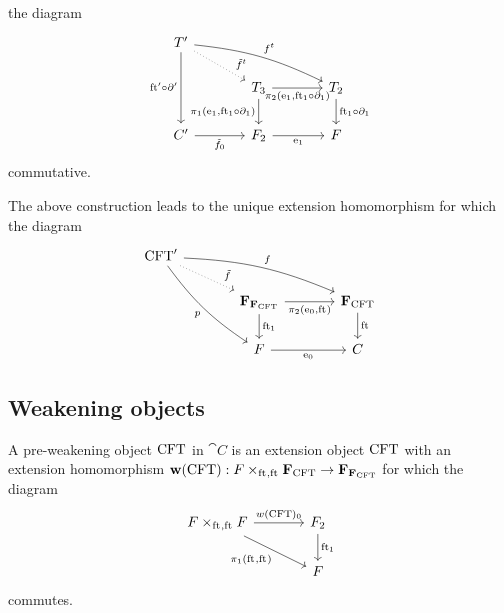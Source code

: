\begin{defn}
\begin{enumerate}
the diagram
\begin{equation*}
\begin{tikzcd}[column sep=large]
\stesyst'
  \ar[bend left=10]{drr}{f^t}
  \ar[swap]{dd}{\eft'\circ\ebd'}
  \ar[dotted]{dr}[near end]{\tilde{f}^t}
  \\
  {}&
\stesyst_3
  \ar{r}[swap]{\pullbackpr{2}{\efamext}{\eft[1]\circ\ebd[1]}}
  \ar{d}[swap]{\pullbackpr{1}{\efamext}{\eft[1]\circ\ebd[1]}}
  &
\stesyst_2
  \ar{d}{\eft[1]\circ\ebd[1]}
  \\
\stesysc'
  \ar{r}[swap]{\tilde{f}_0}
  &
\stesysf_2
  \ar{r}[swap]{\efamext}
  &
\stesysf
\end{tikzcd}
\end{equation*}
commutative.
\end{enumerate}
\end{defn}

\begin{lem}
The above construction leads to the unique extension homomorphism for which
the diagram
\begin{equation*}
\begin{tikzcd}[column sep=large]
\stesys' 
  \ar[bend left=10]{rrd}{f}
  \ar[swap,bend right=10]{ddr}{p}
  \ar[dotted]{dr}[near end]{\tilde{f}}
  \\
  {}&
\famesys{\famesys{\stesys}}
  \ar{r}[swap]{\pullbackpr{2}{\ectxext}{\eft}}
  \ar{d}{\eft[1]}
  &
\famesys{\stesys}
  \ar{d}{\eft}
  \\
  {}&
\stesysf
  \ar{r}[swap]{\ectxext}
  &
\stesysc
\end{tikzcd}
\end{equation*}
\end{lem}

\subsection{Weakening objects}
\begin{defn}
A pre-weakening object $\mathrm{CFT}$ in $\cat{C}$ is an extension object $\mathrm{CFT}$ with 
an extension homomorphism $\mathbf{w}(\stesys):\cobesys{\stesysf}{\famesys{\stesys}}{\eft}{\eft}\to\famesys{\famesys{\stesys}}$ for which the diagram
\begin{equation*}
\begin{tikzcd}[column sep=large]
\pullback{\stesysf}{\stesysf}{\eft}{\eft}
  \ar{r}{w(\stesys)_0}
  \ar{dr}[swap]{\pullbackpr{1}{\eft}{\eft}}
  &
\stesysf_2
  \ar{d}{\eft[1]}
  \\
& \stesysf
\end{tikzcd}
\end{equation*}
commutes.
\end{defn}

